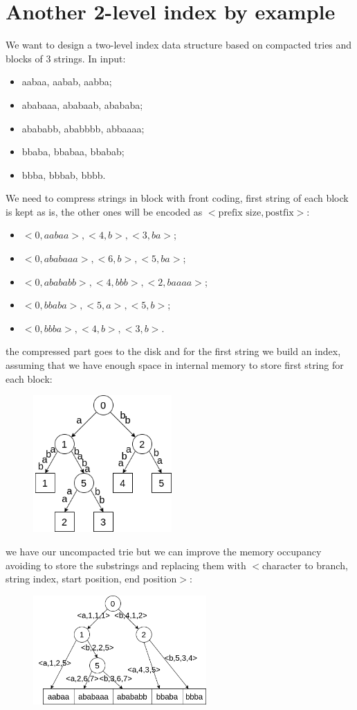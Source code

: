 \section{Another 2-level index by example}
We want to design a two-level index data structure based on compacted tries and blocks of 3 strings.
In input:
\begin{itemize}
    \item aabaa, aabab, aabba;
    \item ababaaa, ababaab, abababa;
    \item abababb, ababbbb, abbaaaa;
    \item bbaba, bbabaa, bbabab;
    \item bbba, bbbab, bbbb.
\end{itemize}
We need to compress strings in block with front coding, first string of each block is kept as is, the other ones will be encoded as $<\text{prefix size}, \text{postfix}>$:
\begin{itemize}
    \item $<0, aabaa>, <4, b>, <3, ba>$;
    \item $<0, ababaaa>, <6, b>, <5, ba>$;
    \item $<0, abababb>, <4, bbb>, <2, baaaa>$;
    \item $<0, bbaba>, <5, a>, <5, b>$;
    \item $<0, bbba>, <4, b>, <3, b>$.
\end{itemize}
the compressed part goes to the disk and for the first string we build an index, assuming that we have enough space in internal memory to store first string for each block:
\begin{figure}[H]
    \centering
    \includegraphics[width=200px]{images/8_Prefix_search/prefix_compacted_trie_example.png}
\end{figure}
we have our uncompacted trie but we can improve the memory occupancy avoiding to store the substrings and replacing them with $<$character to branch, string index, start position, end position$>$:
\begin{figure}[H]
    \centering
    \includegraphics[width=250px]{images/8_Prefix_search/prefix_more_compacted_trie.png}
\end{figure}
